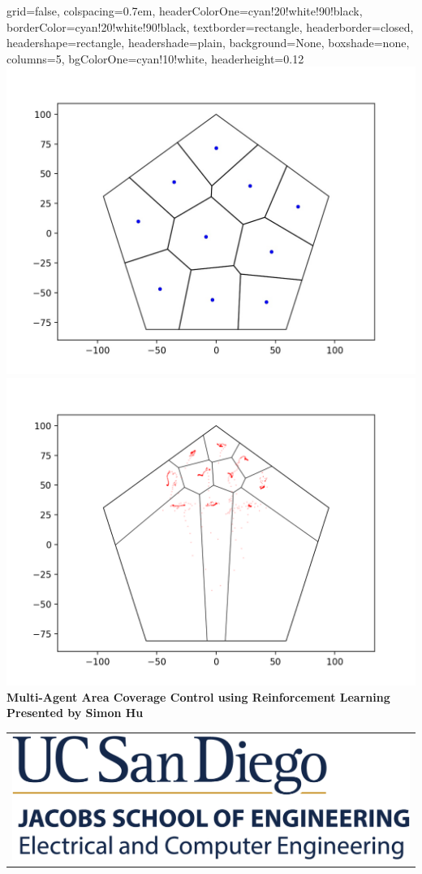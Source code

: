 \documentclass[landscape,a0paper,fontscale=0.292]{baposter}
\begin{document}
\begin{poster}{
grid=false, 
colspacing=0.7em,
headerColorOne=cyan!20!white!90!black,
borderColor=cyan!20!white!90!black,	
textborder=rectangle,
headerborder=closed,
headershape=rectangle,
headershade=plain,
background=None,
boxshade=none,
columns=5,
bgColorOne=cyan!10!white,
headerheight=0.12\textheight}
{
	\includegraphics[scale=0.2]{voronoi_partition}
	\includegraphics[scale=0.2]{gaussian_simulation_1}
}
{\sc\huge\bf Multi-Agent Area Coverage Control using Reinforcement Learning}	
{\Large\bf Presented by Simon Hu}
{
	\begin{tabular}{r}
		\includegraphics[scale=0.5]{logo}
	\end{tabular}
}


\end{poster}
\end{document}
